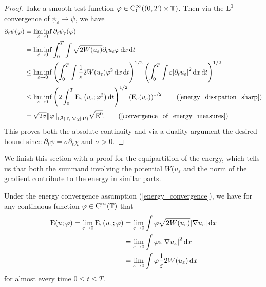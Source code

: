 \begin{proof}
	Take a smooth test function $ \varphi \in \operatorname{C}_{ \mathrm{ C } }^{ \infty } ( ( 0 , T ) \times \operatorname{\mathbb{T}} )$. 
	Then via the $ \operatorname{L}^{ 1 } $-convergence of $ \psi_{ \varepsilon } \to \psi $, we have
	\begin{align*}
		\partial_{ t } \psi ( \varphi )
		& =
		\liminf_{ \varepsilon \to 0 }
			\partial_{ t } \psi_{ \varepsilon } ( \varphi )
		\\
		& =
		\liminf_{ \varepsilon \to 0 }
			\int_{ 0 }^{ T }
				\int
					\sqrt{ 2 W ( u_{ \varepsilon } ) }
					\partial_{ t } u_{ \varepsilon }
					\varphi
				\dd{ x }
			\dd{ t }
		\\
		& \leq
		\liminf_{ \varepsilon \to 0 }
		\left( 
			\int_{ 0 }^{ T }
				\int
					\frac{ 1 }{ \varepsilon } 2 W ( u_{ \varepsilon } )
					\varphi^{ 2 }
				\dd{ x }
			\dd{ t }
		\right)^{ 1/ 2 }
		\left(
			\int_{ 0 }^{ T }
				\int
					\varepsilon
					\abs{ \partial_{ t } u_{ \varepsilon } }^{ 2 }
				\dd{ x }
			\dd{ t }
		\right)^{ 1/2 }
		\\
		& \leq
		\liminf_{ \varepsilon \to 0 }
			\left(
				2 
				\int_{ 0 }^{ T }
					\energy_{ \varepsilon} \left( u_{ \varepsilon } ; \varphi^{ 2 } \right)
				\dd{ t }
			\right)^{ 1/ 2 }
			\left(
				\energy_{ \varepsilon } ( u_{ \varepsilon } )
			\right)^{ 1/2 }
		\tag{\ref{energy_dissipation_sharp}}
		\\
		& =
		\sqrt{ 2 \sigma }
		\norm{ \varphi }_{ \lp^{ 2 } ( \flattorus , \abs{ \nabla \chi } \dd{ t } ) }
		\sqrt{ \energy^{ 0 } }.
		\tag{\ref{convergence_of_energy_measures}}
	\end{align*}
	This proves both the absolute continuity and via a duality argument the desired bound since $ \partial_{ t } \psi = \sigma \partial_{ t } \chi $ and $ \sigma > 0 $.
\end{proof}

We finish this section with a proof for the equipartition of the energy, which tells us that both the summand involving the potential $ W ( u_{ \varepsilon } $ and the norm of the gradient contribute to the energy in similar parts.

\begin{lemma}
	\label{equipartition_of_energies}
	Under the energy convergence assumption (\ref{energy_convergence}), we have for any continuous function $ \varphi \in \operatorname{C}^{ \infty } ( \operatorname{\mathbb{T}} ) $ that
	\begin{align*}
		\operatorname{E} ( u ; \varphi )
		=
		\lim_{ \varepsilon \to 0 }
			\operatorname{E}_{ \varepsilon } ( u_{ \varepsilon } ; \varphi )
		& = 
		\lim_{ \varepsilon \to 0 }
			\int
				\varphi
				\sqrt{ 2 W ( u_{ \varepsilon } ) }
				\abs{ \nabla u_{ \varepsilon } }
			\dd{ x }
		\\
		& =
		\lim_{ \varepsilon \to 0 }
			\int
				\varphi
				\varepsilon
				\abs{ \nabla u_{ \varepsilon } }^{ 2 }
			\dd{ x}
		\\
		& =
		\lim_{ \varepsilon \to 0 }
			\int
				\varphi
				\frac{ 1 }{ \varepsilon }
				2 W ( u_{ \varepsilon } )
			\dd{ x }
	\end{align*}
	for almost every time $ 0 \leq t \leq T $.
\end{lemma}

